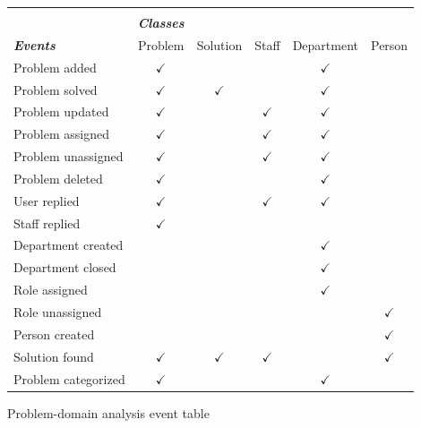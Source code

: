 \begin{figure}[ht]
\begin{tabular}{ l c c c c c} \hline
\\
&\emph{\textbf{Classes}} &  &  & &  \\ 
\emph{\textbf{Events}} & Problem & Solution & Staff & Department & Person \\ \hline
 Problem added 				& $ \checkmark $ &  &  & $ \checkmark $ &  \\ 
 Problem solved 			& $ \checkmark $ & $ \checkmark $ &  & $ \checkmark $ &  \\ 
 Problem updated 			& $ \checkmark $ &  & $ \checkmark $ & $ \checkmark $ &  \\ 
 Problem assigned 		& $ \checkmark $ &  & $ \checkmark $ & $ \checkmark $ &  \\ 
 Problem unassigned 	& $ \checkmark $ &  & $ \checkmark $ & $ \checkmark $ &  \\ 
 Problem deleted 			& $ \checkmark $ &  &  & $ \checkmark $ &  \\ 
 User replied 				& $ \checkmark $ &  & $ \checkmark $ & $ \checkmark $ &  \\ 
 Staff replied 				& $ \checkmark $ &  &  &  &  \\ 
 Department created 	&  &  &  & $ \checkmark $ &  \\ 
 Department closed 		&  &  &  & $ \checkmark $ &  \\ 
 Role assigned 				&  &  &  & $ \checkmark $ &  \\ 
 Role unassigned 			&  &  &  &  & $ \checkmark $ \\ 
 Person created 			&  &  &  &  & $ \checkmark $ \\ 
 Solution found 			& $ \checkmark $ & $ \checkmark $ & $ \checkmark $ &  & $ \checkmark $ \\ 
 Problem categorized	& $ \checkmark $ &  &  & $ \checkmark $ &  \\ \hline
\end{tabular}
\caption{Problem-domain analysis event table}
\label{table:pdaEvent}
\end{figure}